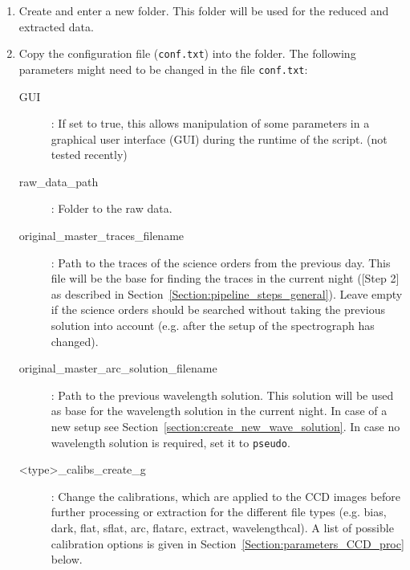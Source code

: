 \documentclass[10pt,a4paper]{article}
\begin{document}
\begin{enumerate}
  \item Create and enter a new folder. This folder will be used for the reduced and extracted data.
  \item Copy the configuration file (\verb|conf.txt|) into the folder. The following parameters might need to be changed in the file \verb|conf.txt|:
  \begin{description}
    \item[GUI] : If set to true, this allows manipulation of some parameters in a graphical user interface (GUI) during the runtime of the script. (not tested recently)
    \item[raw\_data\_path] : Folder to the raw data.
    \item[original\_master\_traces\_filename] : Path to the traces of the science orders from the previous day. This file will be the base for finding the traces in the current night ([Step 2] as described in Section~\ref{Section:pipeline_steps_general}). Leave empty if the science orders should be searched without taking the previous solution into account (e.g. after the setup of the spectrograph has changed).
    \item[original\_master\_arc\_solution\_filename] : Path to the previous wavelength solution. This solution will be used as base for the wavelength solution in the current night. In case of a new setup see Section~\ref{section:create_new_wave_solution}. In case no wavelength solution is required, set it to \verb|pseudo|.
    \item[\textless type\textgreater\_calibs\_create\_g] : Change the calibrations, which are applied to the CCD images before further processing or extraction for the different file types (e.g. bias, dark, flat, sflat, arc, flatarc, extract, wavelengthcal). A list of possible calibration options is given in Section~\ref{Section:parameters_CCD_proc} below.

\end{description}
\end{enumerate}
\end{document}
